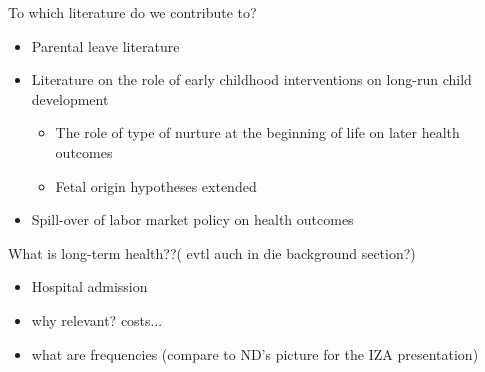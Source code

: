 \documentclass[11pt, a4paper]{article} %
\begin{document}
To which literature do we contribute to?
\begin{itemize}
  \item Parental leave literature
  \item Literature on the role of early childhood interventions on long-run child development
  \begin{itemize}
    \item The role of type of nurture at the beginning of life on later health outcomes
    \item Fetal origin hypotheses extended
  \end{itemize}
  \item Spill-over of labor market policy on health outcomes
\end{itemize}

What is long-term health??( evtl auch in die background section?) 
\begin{itemize}
	\item Hospital admission
	\item why relevant? costs...
	\item what are frequencies (compare to ND's picture for the IZA presentation)
\end{itemize}
\end{document}
